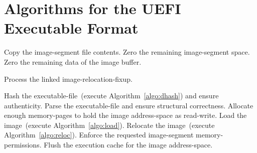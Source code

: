 \section{Algorithms for the UEFI Executable Format}

\begin{algorithm}
  \caption{Loading a UE File.}
  \label{algo:load}
  \begin{algorithmic}[1]
      \State Copy the \gls{image-segment} file contents.
      \State Zero the remaining \gls{image-segment} space.
    \EndFor
    \State Zero the remaining data of the \gls{image} buffer.
  \end{algorithmic}
\end{algorithm}

\begin{algorithm}
  \caption{Relocating a UE File.}
  \label{algo:reloc}
  \begin{algorithmic}[1]
        \State Process the linked \gls{image-relocation-fixup}.
      \EndFor
    \EndFor
  \end{algorithmic}
\end{algorithm}

\begin{algorithm}
  \caption{Setting up a UE File for Execution.}
  \begin{algorithmic}[1]
    \State Hash the \gls{executable-file}~(execute Algorithm~\ref{algo:dhash}) and ensure authenticity.
    \State Parse the \gls{executable-file} and ensure structural correctness.
    \State Allocate enough \glspl{memory-page} to hold the \gls{image} \gls{address-space} as read-write.
    \State Load the \gls{image}~(execute Algorithm~\ref{algo:load}).
    \State Relocate the \gls{image}~(execute Algorithm~\ref{algo:reloc}).
      \State Enforce the requested \gls{image-segment} \glspl{memory-permission}.
    \EndFor
    \State Flush the execution cache for the \gls{image} \gls{address-space}.
  \end{algorithmic}
\end{algorithm}

